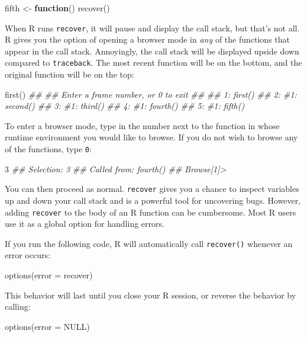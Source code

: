 \documentclass[
  letterpaper,
  DIV=11,
  numbers=noendperiod]{scrbook}
\newenvironment{Shaded}{\begin{snugshade}}{\end{snugshade}}
\newcommand{\AttributeTok}[1]{\textcolor[rgb]{0.40,0.45,0.13}{#1}}
\newcommand{\ConstantTok}[1]{\textcolor[rgb]{0.56,0.35,0.01}{#1}}
\newcommand{\ControlFlowTok}[1]{\textcolor[rgb]{0.00,0.23,0.31}{\textbf{#1}}}
\newcommand{\DecValTok}[1]{\textcolor[rgb]{0.68,0.00,0.00}{#1}}
\newcommand{\DocumentationTok}[1]{\textcolor[rgb]{0.37,0.37,0.37}{\textit{#1}}}
\newcommand{\FunctionTok}[1]{\textcolor[rgb]{0.28,0.35,0.67}{#1}}
\newcommand{\NormalTok}[1]{\textcolor[rgb]{0.00,0.23,0.31}{#1}}
\newcommand{\OtherTok}[1]{\textcolor[rgb]{0.00,0.23,0.31}{#1}}
\begin{document}
\begin{Shaded}
\begin{Highlighting}[]
\NormalTok{fifth }\OtherTok{\textless{}{-}} \ControlFlowTok{function}\NormalTok{() }\FunctionTok{recover}\NormalTok{()}
\end{Highlighting}
\end{Shaded}

When R runs \texttt{recover}, it will pause and display the call stack,
but that's not all. R gives you the option of opening a browser mode in
\emph{any} of the functions that appear in the call stack. Annoyingly,
the call stack will be displayed upside down compared to
\texttt{traceback}. The most recent function will be on the bottom, and
the original function will be on the top:

\begin{Shaded}
\begin{Highlighting}[]
\FunctionTok{first}\NormalTok{()}
\DocumentationTok{\#\# }
\DocumentationTok{\#\# Enter a frame number, or 0 to exit   }
\DocumentationTok{\#\# }
\DocumentationTok{\#\# 1: first()}
\DocumentationTok{\#\# 2: \#1: second()}
\DocumentationTok{\#\# 3: \#1: third()}
\DocumentationTok{\#\# 4: \#1: fourth()}
\DocumentationTok{\#\# 5: \#1: fifth()}
\end{Highlighting}
\end{Shaded}

To enter a browser mode, type in the number next to the function in
whose runtime environment you would like to browse. If you do not wish
to browse any of the functions, type \texttt{0}:

\begin{Shaded}
\begin{Highlighting}[]
\DecValTok{3}
\DocumentationTok{\#\# Selection: 3}
\DocumentationTok{\#\# Called from: fourth()}
\DocumentationTok{\#\# Browse[1]\textgreater{} }
\end{Highlighting}
\end{Shaded}

You can then proceed as normal. \texttt{recover} gives you a chance to
inspect variables up and down your call stack and is a powerful tool for
uncovering bugs. However, adding \texttt{recover} to the body of an R
function can be cumbersome. Most R users use it as a global option for
handling errors.

If you run the following code, R will automatically call
\texttt{recover()} whenever an error occurs:

\begin{Shaded}
\begin{Highlighting}[]
\FunctionTok{options}\NormalTok{(}\AttributeTok{error =}\NormalTok{ recover)}
\end{Highlighting}
\end{Shaded}

This behavior will last until you close your R session, or reverse the
behavior by calling:

\begin{Shaded}
\begin{Highlighting}[]
\FunctionTok{options}\NormalTok{(}\AttributeTok{error =} \ConstantTok{NULL}\NormalTok{)}
\end{Highlighting}
\end{Shaded}



\backmatter
\end{document}
